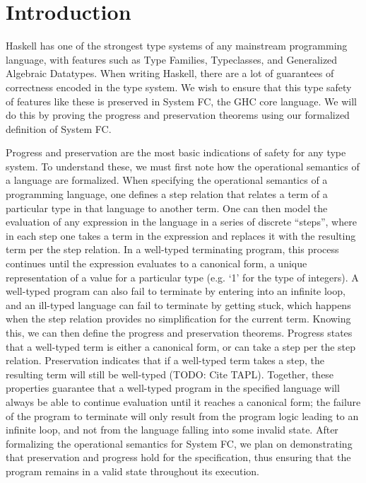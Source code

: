 \documentclass{sig-alternate}
\begin{document}
\section{Introduction}
\label{sec:intro}
Haskell has one of the strongest type systems of any mainstream programming language, with features such as Type Families, Typeclasses, and Generalized Algebraic Datatypes. When writing Haskell, there are a lot of guarantees of correctness encoded in the type system. We wish to ensure that this type safety of features like these is preserved in System FC, the GHC core language.  We will do this by proving the progress and preservation theorems using our formalized definition of System FC.

Progress and preservation are the most basic indications of safety for any type system. To understand these, we must first note how the operational semantics of a language are formalized. When specifying the operational semantics of a programming language, one defines a step relation that relates a term of a particular type in that language to another term. One can then model the evaluation of any expression in the language in a series of discrete “steps”, where in each step one takes a term in the expression and replaces it with the resulting term per the step relation. In a well-typed terminating program, this process continues until the expression evaluates to a canonical form, a unique representation of a value for a particular type (e.g. ‘1’ for the type of integers). A well-typed program can also fail to terminate by entering into an infinite loop, and an ill-typed language can fail to terminate by getting stuck, which happens when the step relation provides no simplification for the current term.
Knowing this, we can then define the progress and preservation theorems. Progress states that a well-typed term is either a canonical form, or can take a step per the step relation. Preservation indicates that if a well-typed term takes a step, the resulting term will still be well-typed (TODO: Cite TAPL). Together, these properties guarantee that a well-typed program in the specified language will always be able to continue evaluation until it reaches a canonical form; the failure of the program to terminate will only result from the program logic leading to an infinite loop, and not from the language falling into some invalid state. After formalizing the operational semantics for System FC, we plan on demonstrating that preservation and progress hold for the specification, thus ensuring that the program remains in a valid state throughout its execution.
\end{document}
